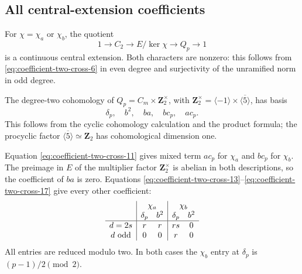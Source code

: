 \subsection{All central-extension coefficients}

For \(\chi=\chi_a\) or \(\chi_b\), the quotient
\begin{equation}
              1\longrightarrow C_2\longrightarrow
                 E/\ker\chi\longrightarrow Q_p
                    \longrightarrow1                   \label{eq:coefficient-two-cross-18}
\end{equation}
is a continuous central extension. Both characters
are nonzero: this follows from \eqref{eq:coefficient-two-cross-6} in even degree
and surjectivity of the unramified norm in odd degree.

The degree-two cohomology of
\(Q_p=C_m\times\mathbf Z_2^\times\), with
\(\mathbf Z_2^\times=\langle-1\rangle\times
\overline{\langle5\rangle}\), has basis
\begin{equation}
                 \delta_p,\quad b^2,\quad ba,
                         \quad b c_p,\quad a c_p.
                                                        \label{eq:coefficient-two-cross-19}
\end{equation}
This follows from the cyclic cohomology calculation
and the product formula; the procyclic factor
\(\overline{\langle5\rangle}\simeq\mathbf Z_2\)
has cohomological dimension one.

Equation \eqref{eq:coefficient-two-cross-11} gives mixed term \(a c_p\) for
\(\chi_a\) and \(b c_p\) for \(\chi_b\).
The preimage in \(E\) of the multiplier factor
\(\mathbf Z_2^\times\) is abelian in both descriptions,
so the coefficient of \(ba\) is zero.
Equations \eqref{eq:coefficient-two-cross-13}--\eqref{eq:coefficient-two-cross-17} give every other coefficient:
\begin{equation}
 \begin{array}{c|cc|cc}
 &\multicolumn{2}{c|}{\chi_a}
 &\multicolumn{2}{c}{\chi_b}\\
 &\delta_p&b^2&\delta_p&b^2\\ \hline
 d=2s &r&r&rs&0\\
 d\text{ odd}&0&0&r&0
 \end{array}                                             \label{eq:coefficient-two-cross-20}
\end{equation}
All entries are reduced modulo two. In both cases
the \(\chi_b\) entry at \(\delta_p\) is
\((p-1)/2\pmod2\).


